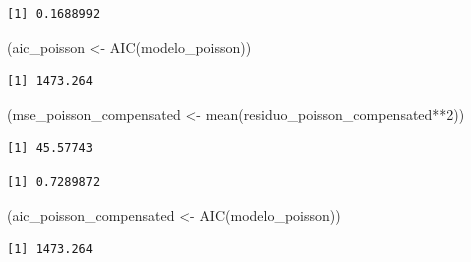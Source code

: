 \documentclass[
  letterpaper,
  DIV=11,
  numbers=noendperiod]{scrreprt}
\newenvironment{Shaded}{\begin{snugshade}}{\end{snugshade}}
\newcommand{\AttributeTok}[1]{\textcolor[rgb]{0.40,0.45,0.13}{#1}}
\newcommand{\DecValTok}[1]{\textcolor[rgb]{0.68,0.00,0.00}{#1}}
\newcommand{\FunctionTok}[1]{\textcolor[rgb]{0.28,0.35,0.67}{#1}}
\newcommand{\NormalTok}[1]{\textcolor[rgb]{0.00,0.23,0.31}{#1}}
\newcommand{\OtherTok}[1]{\textcolor[rgb]{0.00,0.23,0.31}{#1}}
\newcommand{\SpecialCharTok}[1]{\textcolor[rgb]{0.37,0.37,0.37}{#1}}
\begin{document}
\begin{verbatim}
[1] 0.1688992
\end{verbatim}

\begin{Shaded}
\begin{Highlighting}[]
\NormalTok{(aic\_poisson }\OtherTok{\textless{}{-}} \FunctionTok{AIC}\NormalTok{(modelo\_poisson))}
\end{Highlighting}
\end{Shaded}

\begin{verbatim}
[1] 1473.264
\end{verbatim}

\begin{Shaded}
\begin{Highlighting}[]
\NormalTok{(mse\_poisson\_compensated }\OtherTok{\textless{}{-}} \FunctionTok{mean}\NormalTok{(residuo\_poisson\_compensated}\SpecialCharTok{**}\DecValTok{2}\NormalTok{))}
\end{Highlighting}
\end{Shaded}

\begin{verbatim}
[1] 45.57743
\end{verbatim}

\begin{Shaded}
\end{Shaded}

\begin{verbatim}
[1] 0.7289872
\end{verbatim}

\begin{Shaded}
\begin{Highlighting}[]
\NormalTok{(aic\_poisson\_compensated }\OtherTok{\textless{}{-}} \FunctionTok{AIC}\NormalTok{(modelo\_poisson))}
\end{Highlighting}
\end{Shaded}

\begin{verbatim}
[1] 1473.264
\end{verbatim}
\end{document}
